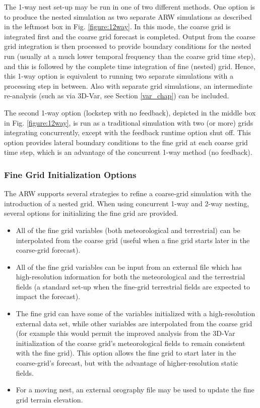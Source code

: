 The 1-way nest set-up may be run in one of two different methods.  One
option is to produce the nested simulation as two separate ARW simulations
as described in the leftmost box in Fig. \ref{figure:12way}.  In this mode,
the coarse grid is integrated first and the coarse grid forecast is completed.  
Output from the coarse grid
integration is then processed to provide boundary conditions for
the nested run (usually at a much lower temporal frequency than the
coarse grid time step), and this is followed by the complete time
integration of fine (nested) grid.  Hence, this 1-way option is equivalent
to running two separate simulations with a processing step in between.  Also with
separate grid simulations, an intermediate re-analysis (such as
via 3D-Var, see Section \ref{var_chap}) can be included.

The second 1-way option (lockstep with no feedback), depicted in the
middle box in Fig. \ref{figure:12way}, is run as a traditional
simulation with two (or more) grids integrating concurrently, except with
the feedback runtime option shut off.  This option provides lateral boundary
conditions to the fine grid at each coarse grid time step, which
is an advantage of the concurrent 1-way method (no feedback).


\subsubsection{Fine Grid Initialization Options}

The ARW supports several strategies to refine a coarse-grid 
simulation with the introduction of a nested grid.  When using concurrent 1-way and
2-way nesting, several options for initializing the fine grid
are provided.
\begin{itemize}\setlength{\parskip}{-4pt}
\item All of the fine grid variables (both meteorological and 
terrestrial) can be interpolated from the coarse grid (useful
when a fine grid starts later in the coarse-grid forecast).
\item All of the fine grid variables can be input from an external file
which has high-resolution information for both the meteorological 
and the terrestrial fields (a standard set-up when the fine-grid 
terrestrial fields are expected to impact the forecast).
\item The fine grid can have some of the variables initialized with a
high-resolution external data set, while other variables are
interpolated from the coarse grid (for example this would permit 
the improved analysis from the 3D-Var initialization of the
coarse grid's meteorological fields to remain consistent with the fine grid).
This option allows the fine grid to start later in the coarse-grid's
forecast, but with the advantage of higher-resolution static fields.
\item For a moving nest, an external orography file may be used to update
the fine grid terrain elevation.  
\end{itemize}

